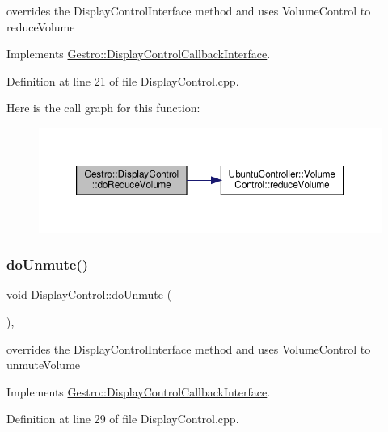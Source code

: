 overrides the Display\+Control\+Interface method and uses Volume\+Control to reduce\+Volume 

Implements \hyperlink{class_gestro_1_1_display_control_callback_interface_a8648fb64585379393917e6b50e348070}{Gestro\+::\+Display\+Control\+Callback\+Interface}.



Definition at line 21 of file Display\+Control.\+cpp.

Here is the call graph for this function\+:
\nopagebreak
\begin{figure}[H]
\begin{center}
\leavevmode
\includegraphics[width=350pt]{class_gestro_1_1_display_control_a874fa3f6b3e4cf465db62a4eba1c1dd1_cgraph}
\end{center}
\end{figure}
\mbox{\label{class_gestro_1_1_display_control_a210411b559d8c3ffb1498f49cfa26a6d}} 
\subsubsection{\texorpdfstring{do\+Unmute()}{doUnmute()}}
{\footnotesize\ttfamily void Display\+Control\+::do\+Unmute (\begin{DoxyParamCaption}{ }\end{DoxyParamCaption})\hspace{0.3cm}{\ttfamily [override]}, {\ttfamily [virtual]}}

overrides the Display\+Control\+Interface method and uses Volume\+Control to unmute\+Volume 

Implements \hyperlink{class_gestro_1_1_display_control_callback_interface_a74ddca7b1ef399a41f6025163407bb4d}{Gestro\+::\+Display\+Control\+Callback\+Interface}.



Definition at line 29 of file Display\+Control.\+cpp.

